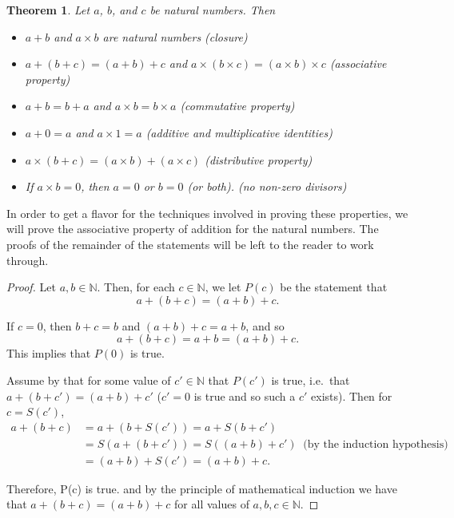 \documentclass[
]{book}
\providecommand{\tightlist}{%
  \setlength{\itemsep}{0pt}\setlength{\parskip}{0pt}}
\newtheorem{theorem}{Theorem}[chapter]
\theoremstyle{definition}
\theoremstyle{definition}
\theoremstyle{definition}
\theoremstyle{definition}
\theoremstyle{remark}
\begin{document}
\begin{theorem}

Let \(a\), \(b\), and \(c\) be natural numbers. Then

\begin{itemize}
\tightlist
\item
  \(a+b\) and \(a\times b\) are natural numbers (closure)
\item
  \(a+(b+c)=(a+b)+c\) and \(a\times (b\times c)=(a\times b)\times c\) (associative property)
\item
  \(a+b=b+a\) and \(a\times b=b\times a\) (commutative property)
\item
  \(a+0=a\) and \(a\times 1 =a\) (additive and multiplicative identities)
\item
  \(a \times (b+c)= (a\times b) + (a\times c)\) (distributive property)
\item
  If \(a\times b=0\), then \(a=0\) or \(b=0\) (or both). (no non-zero divisors)
\end{itemize}

\end{theorem}

In order to get a flavor for the techniques involved in proving these properties, we will prove the associative property of addition for the natural numbers. The proofs of the remainder of the statements will be left to the reader to work through.

\begin{proof}
Let \(a,b \in \mathbb{N}\). Then, for each \(c\in \mathbb{N}\), we let \(P(c)\) be the statement that
\[a+(b+c) = (a+b) + c.\]

If \(c=0\), then \(b+c=b\) and \((a+b)+c=a+b\), and so
\[a+(b+c)=a+b= (a+b)+c.\] This implies that \(P(0)\) is true.

Assume by that for some value of \(c'\in \mathbb{N}\) that \(P(c')\) is true, i.e.~that \(a+(b+c')=(a+b)+c'\) (\(c'=0\) is true and so such a \(c'\) exists). Then for \(c=S(c')\),
\begin{align*}
    a+(b+c) &= a+(b+S(c'))=a+S(b+c') \\
    &= S(a+(b+c')) = S((a+b)+c') \: \mbox{ (by the induction hypothesis)}\\
    &= (a+b)+S(c') = (a+b)+c.
\end{align*}

Therefore, P(c) is true. and by the principle of mathematical induction we have that \(a+(b+c)=(a+b)+c\) for all values of \(a,b,c\in \mathbb{N}\).
\end{proof}
\end{document}

